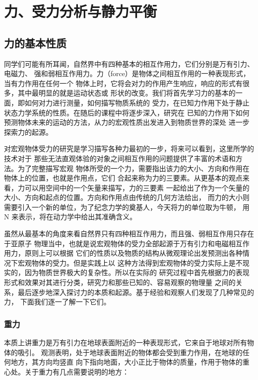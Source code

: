 \begingroup
{}
\chapter{力、受力分析与静力平衡}

{
\graphicspath{{../../../sample/xes-original/first-section/}}
\section{力的基本性质}
同学们可能有所耳闻，自然界中有四种基本的相互作用力，它们分别是万有引力、电磁力、
强和弱相互作用力。力（force）是物体之间相互作用的一种表现形式，当有力作用在任何一个
物体上时，它将会对力的作用产生响应，响应的形式有很多，其中最明显的就是运动状态或
形状的改变。我们将首先学习力的基本的一面，即如何对力进行测量，如何描写物质系统的
受力，在已知力作用下处于静止状态力学系统的性质。在随后的课程中将逐步深入，研究在
已知的力作用下如何预测物体未来的运动的方法，从力的宏观性质出发进入到物质世界的深处
进一步探索力的起源。


对宏观物体受力的研究是学习描写各种力最初的一步，将来可以看到，这里所学的技术对于
那些无法直观体验的对象之间相互作用的问题提供了丰富的术语和方法。为了完整描写宏观
物体所受的一个力，需要指出该力的大小、方向和作用在物体上的位置，也就是作用点，它们
合起来称为力的三要素。从更基本的观点来看，力可以用空间中的一个矢量来描写，力的三要素
一起给出了作为一个矢量的大小、方向和起点的位置。方向和作用点由传统的几何方法给出，
而力的大小则需要引入一个新的单位，为了纪念力学的奠基人，今天将力的单位取为牛顿，
用 N 来表示，将在动力学中给出其准确含义。

虽然从最基本的角度来看自然界只有四种相互作用力，而且强、弱相互作用只存在于亚原子
物理当中，也就是说宏观物体的受力全部起源于万有引力和电磁相互作用力，原则上可以根据
它们的性质以及物质的结构从微观理论出发预测出各种情况下宏观物体的受力。但是实践上以
这种方法得到宏观物体的受力实际上是不现实的，因为物质世界极大的复杂性。所以在实际的
研究过程中首先根据力的表现形式和效果对其进行分类，研究力和那些已知的、容易观察的物理量
之间的关系，最后逐步地深入探讨力的本质和起源。基于经验和观察人们发现了几种常见的力，
下面我们逐一了解一下它们。

\subsection{重力}

本质上讲重力是万有引力在地球表面附近的一种表现形式，它来自于地球对所有物体的吸引。
观测表明，处于地球表面附近的物体都会受到重力作用，在地球的任何地方，其方向均竖直
向下指向地面，大小正比于物体的质量，作用于物体的重心处。关于重力有几点需要说明的地方：

}
